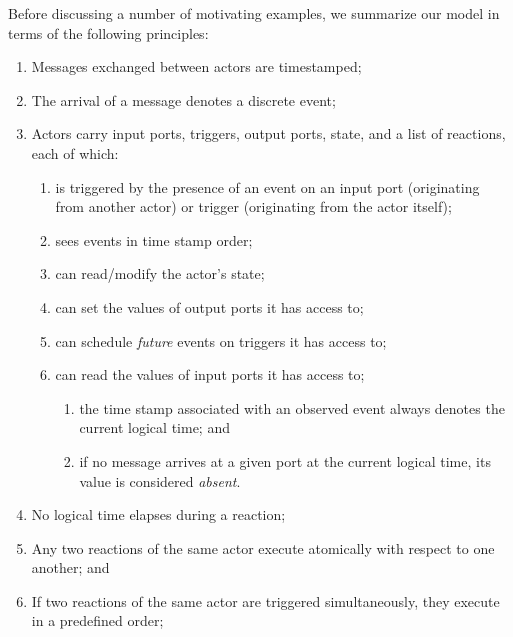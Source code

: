 \documentclass[sigconf]{acmart}
\begin{document}
Before discussing a number of motivating examples, we summarize our model in terms of the following principles:

\begin{enumerate}
\item Messages exchanged between actors are timestamped;
\item The arrival of a message denotes a discrete event;
\item Actors carry input ports, triggers, output ports, state, and a list of reactions, each of which:
\begin{enumerate}
\item is triggered by the presence of an event on an input port (originating from another actor) or trigger (originating from the actor itself);
\item sees events in time stamp order;
\item can read/modify the actor's state;
\item can set the values of output ports it has access to;
\item can schedule \emph{future} events on triggers it has access to;
\item can read the values of input ports it has access to;
\begin{enumerate}
\item the time stamp associated with an observed event always denotes the current logical time; and
\item if no message arrives at a given port at the current logical time, its value is considered \emph{absent}.
\end{enumerate}
\end{enumerate}
\item No logical time elapses during a reaction;
\item Any two reactions of the same actor execute atomically with respect to one another; and
\item If two reactions of the same actor are triggered simultaneously, they execute in a predefined order;
\end{enumerate}


\end{document}
